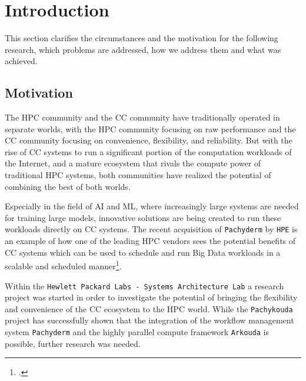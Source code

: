 \chapter{Introduction}
\label{Introduction}

This section clarifies the circumstances and the motivation for the following research,
which problems are addressed, how we address them and what was achieved.

\section{Motivation}

The \ac{HPC} community and the \ac{CC} community have traditionally operated in separate worlds,
with the \ac{HPC} community focusing on raw performance and the \ac{CC} community focusing on convenience, flexibility, and reliability.
But with the rise of \ac{CC} systems to run a significant portion of the computation workloads of the Internet,
and a mature ecosystem that rivals the compute power of traditional \ac{HPC} systems,
both communities have realized the potential of combining the best of both worlds.

Especially in the field of \ac{AI} and \ac{ML}, where increasingly large systems are needed for training large models,
innovative solutions are being created to run these workloads directly on \ac{CC} systems.
The recent acquisition of \texttt{Pachyderm} by \texttt{HPE} is an example of how one of the leading \ac{HPC} vendors
sees the potential benefits of \ac{CC} systems which can be used to schedule and run Big Data workloads in a
scalable and scheduled manner\footcite{nahrenkhizeranHewlettPackardEnterprise}.

Within the \texttt{Hewlett Packard Labs - Systems Architecture Lab} a research project was started in order
to investigate the potential of bringing the flexibility and convenience of the \ac{CC} ecosystem to the \ac{HPC} world.
While the \texttt{Pachykouda} project has successfully shown that the integration of the workflow management system \texttt{Pachyderm}
and the highly parallel compute framework \texttt{Arkouda} is possible, further research was needed.

